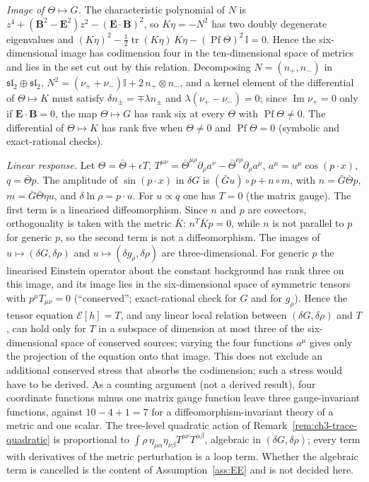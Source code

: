 \emph{Image of \(\Theta\mapsto G\).} The characteristic polynomial of \(N\) is \(z^4+(\mathbf B^2-\mathbf E^2)z^2-(\mathbf E\cdot\mathbf B)^2\), so \(K\eta=-N^2\) has two doubly degenerate eigenvalues and \((K\eta)^2-\tfrac12\operatorname{tr}(K\eta)\,K\eta-(\operatorname{Pf}\Theta)^2\,\mathbb I=0\). Hence the six-dimensional image has codimension four in the ten-dimensional space of metrics and lies in the set cut out by this relation. Decomposing \(N=(n_+,n_-)\) in \(\mathfrak{sl}_2\oplus\mathfrak{sl}_2\), \(N^2=(\nu_++\nu_-)\mathbb I+2\,n_+\otimes n_-\), and a kernel element of the differential of \(\Theta\mapsto K\) must satisfy \(\delta n_\pm=\mp\lambda n_\pm\) and \(\lambda(\nu_+-\nu_-)=0\); since \(\operatorname{Im}\nu_+=0\) only if \(\mathbf E\cdot\mathbf B=0\), the map \(\Theta\mapsto G\) has rank six at every \(\Theta\) with \(\operatorname{Pf}\Theta\neq0\). The differential of \(\Theta\mapsto K\) has rank five when \(\Theta\neq0\) and \(\operatorname{Pf}\Theta=0\) (symbolic and exact-rational checks).

\emph{Linear response.} Let \(\Theta=\bar\Theta+\epsilon T\), \(T^{\mu\nu}=\bar\Theta^{\mu\rho}\partial_\rho a^\nu-\bar\Theta^{\nu\rho}\partial_\rho a^\mu\), \(a^\mu=u^\mu\cos(p\cdot x)\), \(q=\bar\Theta p\). The amplitude of \(\sin(p\cdot x)\) in \(\delta G\) is \((\bar Gu)\circ p+n\circ m\), with \(n=\bar G\bar\Theta p\), \(m=\bar G\bar\Theta\eta u\), and \(\delta\ln\rho=p\cdot u\). For \(u\propto q\) one has \(T=0\) (the matrix gauge). The first term is a linearised diffeomorphism. Since \(n\) and \(p\) are covectors, orthogonality is taken with the metric \(\bar K\): \(n^T\bar Kp=0\), while \(n\) is not parallel to \(p\) for generic \(p\), so the second term is not a diffeomorphism. The images of \(u\mapsto(\delta G,\delta\rho)\) and \(u\mapsto(\delta g_\rho,\delta\rho)\) are three-dimensional. For generic \(p\) the linearised Einstein operator about the constant background has rank three on this image, and its image lies in the six-dimensional space of symmetric tensors with \(p^\mu T_{\mu\nu}=0\) (``conserved''; exact-rational check for \(G\) and for \(g_\rho\)). Hence the tensor equation \(\mathcal E[h]=T\), and any linear local relation between \((\delta G,\delta\rho)\) and \(T\), can hold only for \(T\) in a subspace of dimension at most three of the six-dimensional space of conserved sources; varying the four functions \(a^\mu\) gives only the projection of the equation onto that image. This does not exclude an additional conserved stress that absorbs the codimension; such a stress would have to be derived. As a counting argument (not a derived result), four coordinate functions minus one matrix gauge function leave three gauge-invariant functions, against \(10-4+1=7\) for a diffeomorphism-invariant theory of a metric and one scalar. The tree-level quadratic action of Remark~\ref{rem:ch3-trace-quadratic} is proportional to \(\int\rho\,\eta_{\mu\alpha}\eta_{\nu\beta}T^{\mu\nu}T^{\alpha\beta}\), algebraic in \((\delta G,\delta\rho)\); every term with derivatives of the metric perturbation is a loop term. Whether the algebraic term is cancelled is the content of Assumption~\ref{ass:EE} and is not decided here.


